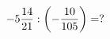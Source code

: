 \documentclass[preview]{standalone}
\begin{document}
\begin{align*}
-5 { 14 \over 21 }  :  \left( - { 10 \over 105 } \right) =  ?
\end{align*}
\end{document}
